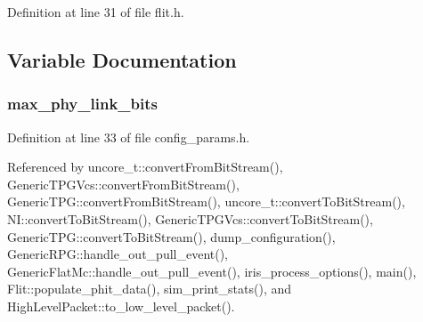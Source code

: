 Definition at line 31 of file flit.h.

\subsection{Variable Documentation}
\subsubsection[{max\_\-phy\_\-link\_\-bits}]{ {\bf max\_\-phy\_\-link\_\-bits}}\label{flit_8h_33b33b16a68e90baa8ffd7d22614fc13}




Definition at line 33 of file config\_\-params.h.

Referenced by uncore\_\-t::convertFromBitStream(), GenericTPGVcs::convertFromBitStream(), GenericTPG::convertFromBitStream(), uncore\_\-t::convertToBitStream(), NI::convertToBitStream(), GenericTPGVcs::convertToBitStream(), GenericTPG::convertToBitStream(), dump\_\-configuration(), GenericRPG::handle\_\-out\_\-pull\_\-event(), GenericFlatMc::handle\_\-out\_\-pull\_\-event(), iris\_\-process\_\-options(), main(), Flit::populate\_\-phit\_\-data(), sim\_\-print\_\-stats(), and HighLevelPacket::to\_\-low\_\-level\_\-packet().